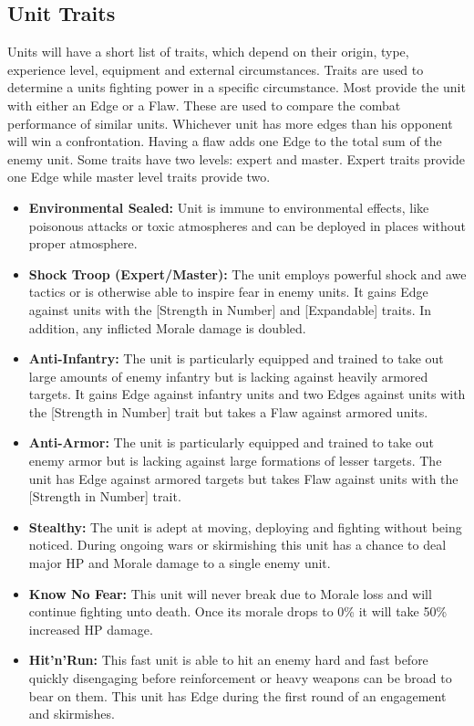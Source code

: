 \subsection{Unit Traits}
Units will have a short list of traits, which depend on their origin, type, experience level, equipment and external circumstances.
Traits are used to determine a units fighting power in a specific circumstance. 
Most provide the unit with either an Edge or a Flaw. 
These are used to compare the combat performance of similar units.
Whichever unit has more edges than his opponent will win a confrontation.
Having a flaw adds one Edge to the total sum of the enemy unit.
Some traits have two levels: expert and master. 
Expert traits provide one Edge while master level traits provide two.
\begin{itemize}
	\item \textbf{Environmental Sealed:} Unit is immune to environmental effects, like poisonous attacks or toxic atmospheres and can be deployed in places without proper atmosphere.
	\item \textbf{Shock Troop (Expert/Master):} The unit employs powerful shock and awe tactics or is otherwise able to inspire fear in enemy units. It gains Edge against units with the [Strength in Number] and [Expandable] traits. In addition, any inflicted Morale damage is doubled.
	\item \textbf{Anti-Infantry:} The unit is particularly equipped and trained to take out large amounts of enemy infantry but is lacking against heavily armored targets. It gains Edge against infantry units and two Edges against units with the [Strength in Number] trait but takes a Flaw against armored units.
	\item \textbf{Anti-Armor:} The unit is particularly equipped and trained to take out enemy armor but is lacking against large formations of lesser targets. The unit has Edge against armored targets but takes Flaw against units with the [Strength in Number] trait.
	\item \textbf{Stealthy:} The unit is adept at moving, deploying and fighting without being noticed. During ongoing wars or skirmishing this unit has a chance to deal major HP and Morale damage to a single enemy unit.
	\item \textbf{Know No Fear:} This unit will never break due to Morale loss and will continue fighting unto death. Once its morale drops to 0\% it will take 50\% increased HP damage.
	\item \textbf{Hit'n'Run:} This fast unit is able to hit an enemy hard and fast before quickly disengaging before reinforcement or heavy weapons can be broad to bear on them. This unit has Edge during the first round of an engagement and skirmishes.

\end{itemize}
